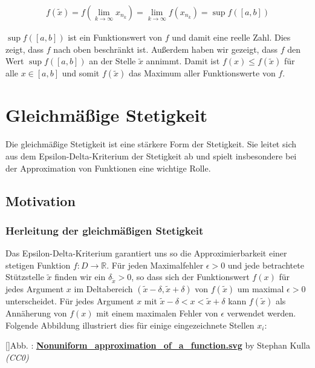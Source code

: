 \documentclass[fontsize=9pt,
               parskip=half-,
               DIV=14,
               listof=chapterentry,
               tocflat]{scrbook}
\newcounter{imagelabel}
\begin{document}
\begin{proof*}
\begin{align*}
f\left({\tilde {x}}\right)=f\left(\lim _{k\to \infty }x_{n_{k}}\right)=\lim _{k\to \infty }f\left(x_{n_{k}}\right)=\sup f([a,b])
\end{align*}

$\sup f([a,b])$ ist ein Funktionswert von $f$ und damit eine reelle Zahl. Dies zeigt, dass $f$ nach oben beschränkt ist. Außerdem haben wir gezeigt, dass $f$ den Wert $\sup f([a,b])$ an der Stelle ${\tilde {x}}$ annimmt. Damit ist $f(x)\leq f({\tilde {x}})$ für alle $x\in [a,b]$ und somit $f({\tilde {x}})$ das Maximum aller Funktionswerte von $f$.

\end{proof*}

\chapter{Gleichmäßige Stetigkeit}

Die gleichmäßige Stetigkeit ist eine stärkere Form der Stetigkeit. Sie leitet sich aus dem Epsilon-Delta-Kriterium der Stetigkeit ab und spielt insbesondere bei der Approximation von Funktionen eine wichtige Rolle.

\section{Motivation}

\subsection{Herleitung der gleichmäßigen Stetigkeit}

Das Epsilon-Delta-Kriterium garantiert uns so die Approximierbarkeit einer stetigen Funktion $f:D\to \mathbb {R} $. Für jeden Maximalfehler $\epsilon >0$ und jede betrachtete Stützstelle ${\tilde {x}}$ finden wir ein $\delta _{\tilde {x}}>0$, so dass sich der Funktionswert $f(x)$ für jedes Argument $x$ im Deltabereich $({\tilde {x}}-\delta ,{\tilde {x}}+\delta )$ von $f({\tilde {x}})$ um maximal $\epsilon >0$ unterscheidet. Für jedes Argument $x$ mit ${\tilde {x}}-\delta <x<{\tilde {x}}+\delta $ kann $f({\tilde {x}})$ als Annäherung von $f(x)$ mit einem maximalen Fehler von $\epsilon $ verwendet werden. Folgende Abbildung illustriert dies für einige eingezeichnete Stellen $x_{i}$:

[]{Abb. : \protect\href{https://commons.wikimedia.org/wiki/File:Nonuniform_approximation_of_a_function.svg}{\textbf{Nonuniform\allowbreak\_approximation\allowbreak\_of\allowbreak\_a\allowbreak\_function.svg}} by Stephan Kulla \textit{(CC0)}}\begin{center}
\end{center}
\end{document}

